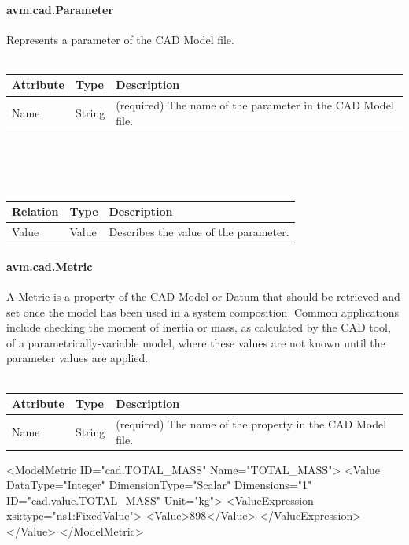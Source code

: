 \paragraph{avm.cad.Parameter}
Represents a parameter of the CAD Model file.
\\ \\
\begin{tabular}{ l l p{11cm} }
\textbf{Attribute} & \textbf{Type} & \textbf{Description} \\ \hline
Name & String & (required) The name of the parameter in the CAD Model file. \\ \hline
\end{tabular}
\\ \\ \\
\begin{tabular}{ l l p{11cm} }
\textbf{Relation} & \textbf{Type} & \textbf{Description} \\ \hline
Value & Value & Describes the value of the parameter. \\ \hline
\end{tabular}

\paragraph{avm.cad.Metric}
A Metric is a property of the CAD Model or Datum that should be retrieved and set once the model has been used in a system composition.
Common applications include checking the moment of inertia or mass, as calculated by the CAD tool, of a parametrically-variable model, where these values are not known until the parameter values are applied.
\\ \\
\begin{tabular}{ l l p{11cm} }
\textbf{Attribute} & \textbf{Type} & \textbf{Description} \\ \hline
Name & String & (required) The name of the property in the CAD Model file. \\ \hline
\end{tabular}

\begin{MyVerbatim}
   <ModelMetric ID="cad.TOTAL_MASS" Name="TOTAL_MASS">
      <Value DataType="Integer" DimensionType="Scalar" Dimensions="1" 
        ID="cad.value.TOTAL_MASS" Unit="kg">
        <ValueExpression xsi:type="ns1:FixedValue">
          <Value>898</Value>
        </ValueExpression>
      </Value>
    </ModelMetric>
\end{MyVerbatim}

